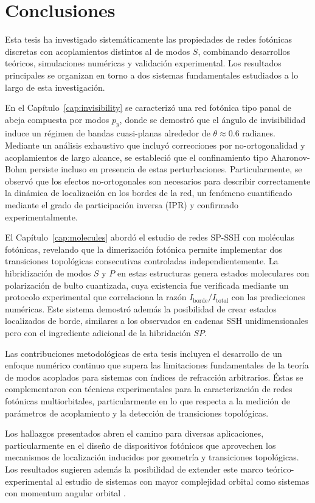 \chapter{Conclusiones \label{cap:conclu}}

Esta tesis ha investigado sistemáticamente las propiedades de redes fotónicas discretas con acoplamientos distintos al de modos $S$, combinando desarrollos teóricos, simulaciones numéricas y validación experimental. Los resultados principales se organizan en torno a dos sistemas fundamentales estudiados a lo largo de esta investigación.

En el Capítulo~\ref{cap:invisibility} se caracterizó una red fotónica tipo panal de abeja compuesta por modos $p_y$, donde se demostró que el ángulo de invisibilidad induce un régimen de bandas cuasi-planas alrededor de $\theta \approx 0.6$ radianes. Mediante un análisis exhaustivo que incluyó correcciones por no-ortogonalidad y acoplamientos de largo alcance, se estableció que el confinamiento tipo Aharonov-Bohm persiste incluso en presencia de estas perturbaciones. Particularmente, se observó que los efectos no-ortogonales son necesarios para describir correctamente la dinámica de localización en los bordes de la red, un fenómeno cuantificado mediante el grado de participación inversa (IPR) y confirmado experimentalmente.

El Capítulo~\ref{cap:molecules} abordó el estudio de redes SP-SSH con moléculas fotónicas, revelando que la dimerización fotónica permite implementar dos transiciones topológicas consecutivas controladas independientemente. La hibridización de modos $S$ y $P$ en estas estructuras genera estados moleculares con polarización de bulto cuantizada, cuya existencia fue verificada mediante un protocolo experimental que correlaciona la razón $I_{\text{borde}}/I_{\text{total}}$ con las predicciones numéricas. Este sistema demostró además la posibilidad de crear estados localizados de borde, similares a los observados en cadenas SSH unidimensionales pero con el ingrediente adicional de la hibridación $SP$.

Las contribuciones metodológicas de esta tesis incluyen el desarrollo de un enfoque numérico continuo que supera las limitaciones fundamentales de la teoría de modos acoplados para sistemas con índices de refracción arbitrarios. Éstas se complementaron con técnicas experimentales para la caracterización de redes fotónicas multiorbitales, particularmente en lo que respecta a la medición de parámetros de acoplamiento y la detección de transiciones topológicas.

Los hallazgos presentados abren el camino para diversas aplicaciones, particularmente en el diseño de dispositivos fotónicos que aprovechen los mecanismos de localización inducidos por geometría y transiciones topológicas. Los resultados sugieren además la posibilidad de extender este marco teórico-experimental al estudio de sistemas con mayor complejidad orbital como sistemas con momentum angular orbital \citep{OAMCaging}.